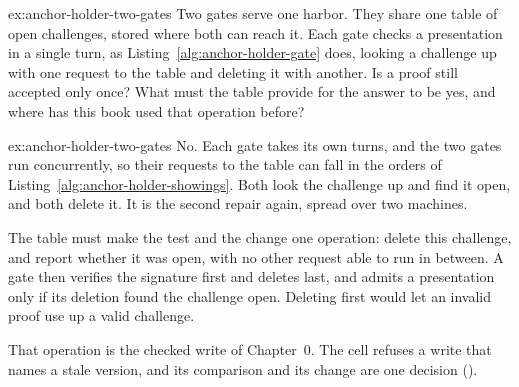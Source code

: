 \documentclass[11pt,a4paper]{article}
\theoremstyle{definition}
\begin{document}
\begin{pdexercise}[kind=Open,rating=3]{ex:anchor-holder-two-gates}
Two gates serve one harbor. They share one table of open challenges, stored where both can reach it. Each gate checks a presentation in a single turn, as Listing~\ref{alg:anchor-holder-gate} does, looking a challenge up with one request to the table and deleting it with another. Is a proof still accepted only once? What must the table provide for the answer to be yes, and where has this book used that operation before?
\end{pdexercise}
\begin{pdsolution}{ex:anchor-holder-two-gates}
No. Each gate takes its own turns, and the two gates run concurrently, so their requests to the table can fall in the orders of Listing~\ref{alg:anchor-holder-showings}. Both look the challenge up and find it open, and both delete it. It is the second repair again, spread over two machines.

The table must make the test and the change one operation: delete this challenge, and report whether it was open, with no other request able to run in between. A gate then verifies the signature first and deletes last, and admits a presentation only if its deletion found the challenge open. Deleting first would let an invalid proof use up a valid challenge.

That operation is the checked write of Chapter~0. The cell refuses a write that names a stale version, and its comparison and its change are one decision ().
\end{pdsolution}

\end{document}
